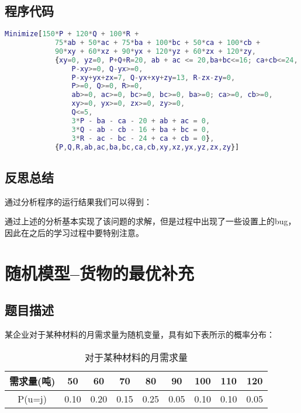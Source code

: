 \documentclass[UTF8]{ctexart}
\begin{document}
    \subsection{程序代码}
\begin{lstlisting}[language=matlab]
Minimize[150*P + 120*Q + 100*R + 
            75*ab + 50*ac + 75*ba + 100*bc + 50*ca + 100*cb + 
            90*xy + 60*xz + 90*yx + 120*yz + 60*zx + 120*zy, 
            {xy=0, yz=0, P+Q+R=20, ab + ac <= 20,ba+bc<=16; ca+cb<=24,
                P-xy>=0, Q-yx>=0, 
                P-xy+yx+zx=7, Q-yx+xy+zy=13, R-zx-zy=0, 
                P>=0, Q>=0, R>=0, 
                ab>=0, ac>=0, bc>=0, bc>=0, ba>=0; ca>=0, cb>=0,
                xy>=0, yx>=0, zx>=0, zy>=0,
                Q<=5,
                3*P - ba - ca - 20 + ab + ac = 0,
                3*Q - ab - cb - 16 + ba + bc = 0,
                3*R - ac - bc - 24 + ca + cb = 0},
            {P,Q,R,ab,ac,ba,bc,ca,cb,xy,xz,yx,yz,zx,zy}]
\end{lstlisting}

    \subsection{反思总结}
    通过分析程序的运行结果我们可以得到：

    通过上述的分析基本实现了该问题的求解，但是过程中出现了一些设置上的bug，因此在之后的学习过程中要特别注意。

    \section{随机模型--货物的最优补充}
    \subsection{题目描述}
    某企业对于某种材料的月需求量为随机变量，具有如下表所示的概率分布：
    \begin{table}[!htb]
      \centering
      \begin{tabular}{|c|c|c|c|c|c|c|c|c|}
        \hline
        需求量(吨) & 50 & 60 & 70 & 80 & 90 & 100 & 110 & 120 \\
        \hline
        P(u=j) & 0.10 & 0.20 & 0.15 & 0.25 & 0.05 & 0.10 & 0.10 & 0.05 \\
        \hline
      \end{tabular}
      \caption{对于某种材料的月需求量}\label{对于某种材料的月需求量}
    \end{table}
\end{document}
